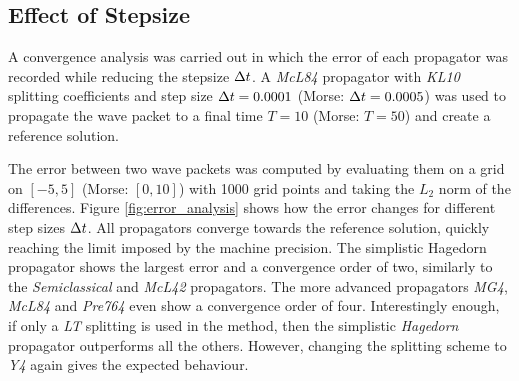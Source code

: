 \subsection{Effect of Stepsize}
\label{subsec:convergence}
%
A convergence analysis was carried out in which the error of each propagator was recorded while reducing the stepsize $\Delta t$.
A \emph{McL84} propagator with \emph{KL10} splitting coefficients and step size $\Delta t = 0.0001$ (Morse: $\Delta t = 0.0005$) was used to propagate the wave packet to a final time $T = 10$ (Morse: $T=50$) and create a reference solution.
\par\medskip
%
The error between two wave packets was computed by evaluating them on a grid on $[-5,5]$ (Morse: $[0,10]$) with 1000 grid points and taking the $L_2$ norm of the differences.
Figure \ref{fig:error_analysis} shows how the error changes for different step sizes $\Delta t$.
All propagators converge towards the reference solution, quickly reaching the limit imposed by the machine precision.
The simplistic Hagedorn propagator shows the largest error and a convergence order of two, similarly to the \emph{Semiclassical} and \emph{McL42} propagators.
The more advanced propagators \emph{MG4}, \emph{McL84} and \emph{Pre764} even show a convergence order of four.
Interestingly enough, if only a \emph{LT} splitting is used in the  method, then the simplistic \emph{Hagedorn} propagator outperforms all the others. However, changing the splitting scheme to \emph{Y4} again gives the expected behaviour.
%
